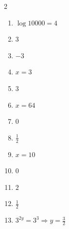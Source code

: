 \documentclass[11pt]{article}
\begin{document}
\begin{keybox}
\begin{multicols}{2}
\small
\begin{enumerate}[leftmargin=*,itemsep=3pt]
  \item $\log 10000=4$
  \item $3$
  \item $-3$
  \item $x=3$
  \item $3$
  \item $x=64$
  \item $0$
  \item $\tfrac12$
  \item $x=10$
  \item $0$
  \item $2$
  \item $\tfrac12$
  \item $3^{2y}=3^3\Rightarrow y=\tfrac32$
\end{enumerate}
\end{multicols}
\end{keybox}
\end{document}
